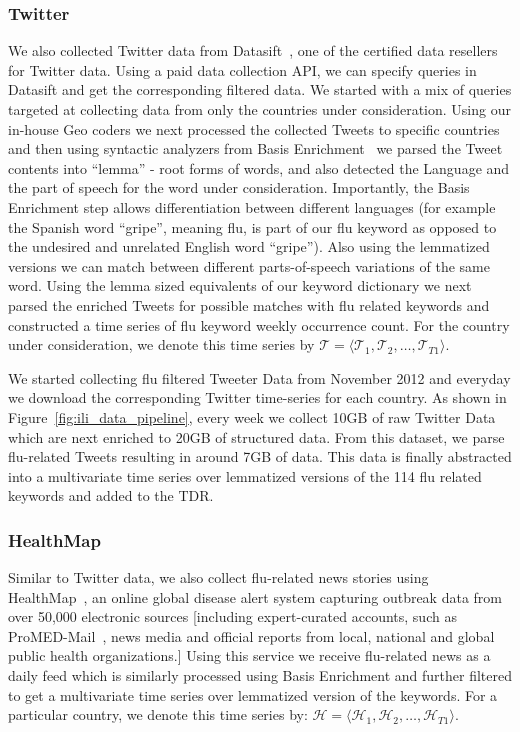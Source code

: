 \subsubsection{Twitter} 
We also collected Twitter data from Datasift~\cite{Twitter:2013},
one of the certified data resellers for
Twitter data. Using a paid data collection API, we can specify queries in
Datasift and get the corresponding filtered data.  We started with a mix of
queries targeted at collecting data from only the countries under
consideration. Using our in-house Geo coders we next processed the collected
Tweets to specific countries and then using syntactic analyzers from Basis
Enrichment~\cite{Basis:2013} we parsed the Tweet contents into ``lemma'' - root
forms of words, and also detected the Language and the part of speech for the
word under consideration.  Importantly, the Basis Enrichment step allows
differentiation between different languages (for example the Spanish word
``gripe'', meaning flu, is part of our flu keyword as opposed to the undesired
and unrelated English word ``gripe''). Also using the lemmatized versions we
can match between different parts-of-speech variations of the same word. Using
the lemma sized equivalents of our keyword dictionary we next parsed the
enriched Tweets for possible matches with flu related keywords and constructed
a time series of flu keyword weekly occurrence count. For the country under
consideration, we denote this time series by 
$\mathcal{T} = \langle \mathcal{T}_1, \mathcal{T}_2, \dots, \mathcal{T}_{T1} \rangle$.

We started collecting flu filtered Tweeter Data from November 2012 and everyday
we download the corresponding Twitter time-series for each country. As shown in
Figure~\ref{fig:ili_data_pipeline}, every week we collect 10GB of raw Twitter
Data which are next enriched to 20GB of structured data. From this dataset, we
parse flu-related Tweets resulting in around 7GB of data. This data is finally
abstracted into a multivariate time series over lemmatized versions of the 114
flu related keywords and added to the TDR. 

\subsubsection{HealthMap} 
Similar to Twitter data, we also collect flu-related
news stories using HealthMap~\cite{HM:2013}, an online global disease alert
system capturing outbreak data from over 50,000 electronic sources [including
  expert-curated accounts, such as ProMED-Mail~\cite{chase1996promed}, news media
and official reports from local, national and global public health
organizations.] Using this service we receive flu-related news as a daily feed
which is similarly processed using Basis Enrichment and further filtered to get
a multivariate time series over  lemmatized version of the keywords. For a
particular country, we denote this time series by: 
$\mathcal{H} = \langle \mathcal{H}_1, \mathcal{H}_2, \dots, \mathcal{H}_{T1} \rangle$.


